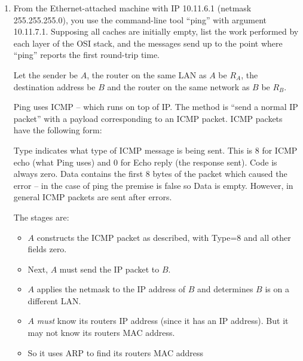 \documentclass[10pt,\jkfside,a4paper]{article}
\begin{document}
\begin{enumerate}

\item From the Ethernet-attached machine with IP 10.11.6.1
(netmask 255.255.255.0), you use the command-line tool ``ping'' with
argument 10.11.7.1. Supposing all caches are initially empty, list the work
performed by each layer of the OSI stack, and the messages send up to the
point where ``ping'' reports the first round-trip time.

Let the sender be $A$, the router on the same LAN as $A$ be $R_A$, the
destination address be $B$ and the router on the same network as $B$ be $R_B$.

Ping uses ICMP -- which runs on top of IP\@. The method is ``send a
normal IP packet'' with a payload corresponding to an ICMP packet. ICMP
packets have the following form:
\begin{center}
\end{center}
Type indicates what type of ICMP message is being sent. This is 8 for ICMP
echo (what Ping uses) and 0 for Echo reply (the response sent). Code is
always zero. Data contains the first 8 bytes of the packet which caused the
error -- in the case of ping the premise is false so Data is empty.
However, in general ICMP packets are sent after errors.

The stages are:

\begin{itemize}

\item $A$ constructs the ICMP packet as described, with Type=8 and all
other fields zero.

\item Next, $A$ must send the IP packet to $B$.

\item $A$ applies the netmask to the IP address of $B$ and determines $B$
is on a different LAN\@.

\item $A$ \textit{must} know its routers IP address (since it has an IP
address). But it may not know its routers MAC address.

\item So it uses ARP to find its routers MAC address


\end{itemize}
\end{enumerate}
\end{document}
